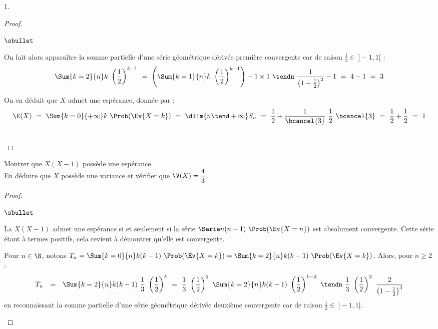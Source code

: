 \begin{noliste}{1.}
\begin{proof}
\begin{noliste}{$\sbullet$}
      \newpage


    \item On fait alors apparaître la somme partielle d'une série
      géométrique dérivée première convergente car de raison
      $\frac{1}{2} \in \ ]-1,1[$ :
      \[
      \Sum{k = 2}{n} k \ \left( \dfrac{1}{2} \right)^{k-1} \ = \
      \left( \Sum{k = 1}{n} k \ \left( \dfrac{1}{2} \right)^{k-1}
      \right) - 1 \times 1 \ \tendn \ \dfrac{1}{\left( 1 - \frac{1}{2}
        \right)^2} - 1 \ = \ 4 - 1 \ = \ 3
      \]

    \item On en déduit que $X$ admet une espérance, donnée par :
      \[
      \E(X) \ = \ \Sum{k=0}{+\infty} k \ \Prob(\Ev{X = k}) \ = \
      \dlim{n \tend +\infty} S_n \ = \ \dfrac{1}{2} +
      \dfrac{1}{\bcancel{3}} \ \dfrac{1}{2} \ \bcancel{3} \ = \
      \dfrac{1}{2} + \dfrac{1}{2} \ = \ 1
      \]
    \end{noliste}
    \conc{$\E(X) = 1$}~\\[-1.2cm]
  \end{proof}

\item Montrer que $X (X-1)$ possède une espérance. \\
  En déduire que $X$ possède une variance et vérifier que $\V(X) =
  \dfrac{4}{3}$.

  \begin{proof}~%
    \begin{noliste}{$\sbullet$}
    \item La \var $X(X-1)$ admet une espérance si et seulement si la
      série $\Serie n(n-1) \ \Prob(\Ev{X = n})$ est absolument
      convergente. Cette série étant à termes positifs, cela revient à
      démontrer qu'elle est convergente.

    \item Pour $n \in \N$, notons $T_n = \Sum{k = 0}{n} k(k-1) \
      \Prob(\Ev{X = k}) = \Sum{k = 2}{n} k(k-1) \ \Prob(\Ev{X =
        k})$. Alors, pour $n \geq 2$ :
      \[
      \begin{array}{rcl}
        T_n & = & \Sum{k = 2}{n} k(k-1) \ \dfrac{1}{3} \ \left(
          \dfrac{1}{2} \right)^k 
        \ = \ \dfrac{1}{3} \ \left(\dfrac{1}{2}
        \right)^2 \ \Sum{k =  2}{n} k(k-1) \ \left( \dfrac{1}{2}
        \right)^{k-2}
        \ \tendn \ \dfrac{1}{3} \ \left(\dfrac{1}{2}
        \right)^2 \ \dfrac{2}{\left(1 - \frac{1}{2} \right)^3}
      \end{array}
      \]
      en reconnaissant la somme partielle d'une série géométrique
      dérivée deuxième convergente car de raison $\frac{1}{2} \in \
      ]-1,1[$.


\end{noliste}
\end{proof}
\end{noliste}
